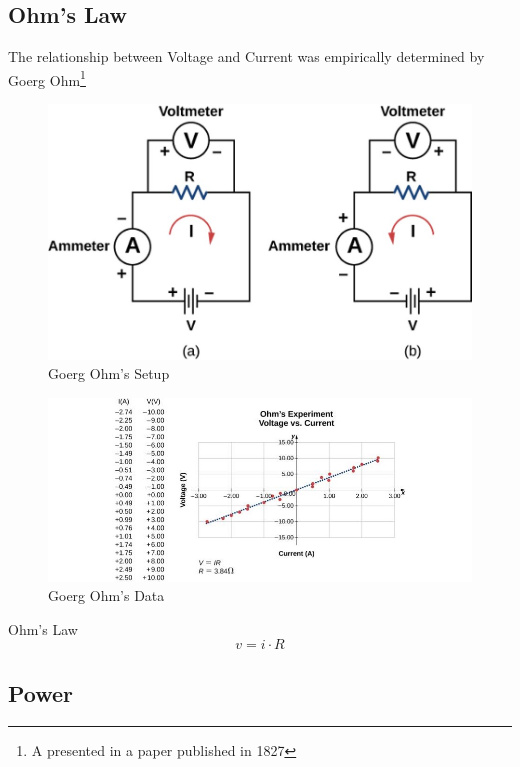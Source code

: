 \documentclass[14pt]{memoir}
\begin{document}
\subsection{Ohm's Law}
The relationship between Voltage and Current was empirically determined by Goerg Ohm\footnote{A presented in a paper published in 1827}

\begin{figure}[H]
\begin{center}
\includegraphics[scale=0.50]{fig/fig_09_19.jpg}
\caption{Goerg Ohm's Setup}
\label{fig:09_19}
\end{center}
\end{figure}

\begin{figure}[H]
\begin{center}
\includegraphics[scale=0.50]{fig/fig_09_20.jpg}
\caption{Goerg Ohm's Data}
\label{fig:09_20}
\end{center}
\end{figure}

Ohm's Law
\begin{equation}
v = i \cdot R
\end{equation}

\subsection{Power}
\end{document}
